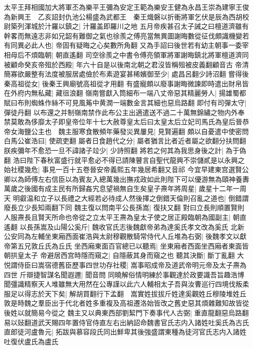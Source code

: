 太平王拜相國加大將軍丕為樂平王彌為安定王範為樂安王健為永昌王崇為建寧王俊為新興王　乙亥詔封仇池公楊盛為武都王　秦王熾磐以折衝將軍乞伏是辰為西胡校尉築列渾城於汁羅以鎮之|{
	汁羅盖即羅川之地}
五月帝疾甚召太子誡之曰檀道濟雖有幹畧而無遠志非如兄韶有難御之氣也徐羨之傅亮當無異圖謝晦數從征伐頗識機變若有同異必此人也|{
	帝固有疑晦之心矣數所角翻}
又為手詔曰後世若有幼主朝事一委宰相母后不煩臨朝|{
	朝直遙翻}
司空徐羨之中書令傅亮領軍將軍謝晦鎮北將軍檀道濟同被顧命癸亥帝殂於西殿|{
	年六十自是以後南北朝之君沒皆稱殂被皮義翻顧音古}
帝清簡寡欲嚴整有法度被服居處儉於布素遊宴甚稀嬪御至少|{
	處昌呂翻少詩沼翻}
嘗得後秦高祖從女|{
	後秦王興廟號高祖從才用翻}
有盛寵頗以廢事謝晦微諫即時遣出財帛皆在外府内無私藏|{
	藏徂浪翻}
嶺南嘗獻入筒細布一端八丈帝惡其精麗勞人|{
	揚雄蜀都賦曰布則蜘蛛作絲不可見風䇶中黄潤一端數金言其細也惡烏路翻}
即付有司彈太守|{
	彈徒丹翻}
以布還之并制嶺南禁作此布公主出適遣送不過二十萬無錦繡之物内外奉禁莫敢為侈靡太子即皇帝位年十七大赦尊皇太后曰太皇太后立妃司馬氏為皇后晉恭帝女海鹽公主也　魏主服寒食散頻年藥發災異屢見|{
	見賢遍翻}
頗以自憂遣中使密問白馬公崔浩曰|{
	使疏吏翻}
屬者日食趙代之分|{
	屬者猶言比者近者屬之欲翻分扶問翻}
朕疾彌年不愈恐一旦不諱諸子竝少|{
	少詩照翻}
將若之何其為我思身後之計|{
	為于偽翻}
浩曰陛下春秋富盛行就平愈必不得已請陳瞽言自聖代龍興不崇儲貳是以永興之始社稷幾危|{
	事見一百十五卷晉安帝義熙五年幾居希翻又音祁}
今宜早建東宫選賢公卿以為師傅左右信臣以為賓友入總萬幾出撫戎政如此則陛下可以優游無為頤神養夀萬歲之後國有成主民有所歸姦宄息望禍無自生矣皇子燾年將周星|{
	歲星十二年一周天}
明叡温和立子以長禮之大經若必待成人然後擇之倒錯天倫則召亂之道也|{
	倒錯謂廢長立少長知兩翻下同}
魏主復以問南平公長孫嵩|{
	復扶又翻}
對曰立長則順置賢則人服燾長且賢天所命也帝從之立太平王燾為皇太子使之居正殿臨朝為國副主|{
	朝直遙翻}
以長孫嵩及山陽公奚斤|{
	魏收官氏志後魏獻帝弟為達奚氏孝文改為奚氏}
北新公安同為左輔坐東廂西面崔浩與太尉穆觀散騎常侍代人丘堆為右弼|{
	後魏孝文以獻帝第五兄敦丘氏為丘氏}
坐西廂東面百官總已以聽焉|{
	坐東廂者西面坐西廂者東面皆朝拱皇太子}
帝避居西宫時隱而窺之|{
	自隱蔽其身而窺之也}
聽其決斷|{
	斷丁亂翻}
大悦謂侍臣曰嵩宿德舊臣歷事四世功存社稷|{
	嵩事昭成帝及道武帝明元帝及太子燾為四世}
斤辯捷智謀名聞遐邇|{
	聞音問}
同曉解俗情明練於事觀達於政要識吾旨趣浩博聞彊識精察天人堆雖無大用然在公專謹以此六人輔相太子吾與汝曹巡行四境伐叛柔服足以得志於天下矣|{
	解胡買翻行下孟翻　嵩實姓拔拔斤姓達奚觀姓丘穆陵堆姓丘敦是時魏之羣臣出于代北者姓多重複及高祖遷洛始皆改之舊史惡其煩雜難知故皆從後姓以就簡易今從之}
魏主又以典東西部劉絜門下奏事代人古弼|{
	重直龍翻惡烏路翻易以䜴翻道武天賜四年置侍官侍直左右出納詔命魏書官氏志内入諸姓吐奚氏為古氏}
直郎徒河盧魯元|{
	拓跋與慕容段氏同出鮮卑其後強盛謂東種為徒河官氏志内入諸姓吐復伏盧氏為盧氏}
